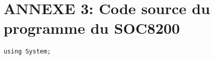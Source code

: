 \section{ANNEXE 3: Code source du programme du SOC8200}
\begin{lstlisting}
using System;

\end{lstlisting}

